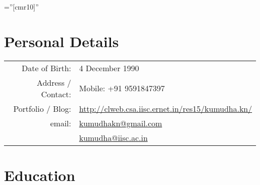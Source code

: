 \documentclass[a4paper,10pt]{article} %
\begin{document}
\pagestyle{empty} %

\font\fb=''[cmr10]'' %


\par{\bigskip\par} %

\section{Personal Details}
\begin{tabular}{rl}
Date of Birth: & 4 December 1990 \\
Address / Contact: & Mobile: +91 9591847397 \\
Portfolio / Blog: & \href{http://clweb.csa.iisc.ernet.in/res15/kumudha.kn/}{http://clweb.csa.iisc.ernet.in/res15/kumudha.kn/}\\
email: & \href{mailto:kumudhakn@gmail.com}{kumudhakn@gmail.com}\\ 
& \href{mailto:kumudha@iisc.ac.in}{kumudha@iisc.ac.in}\\
\end{tabular}


\section{Education}
\end{document}
